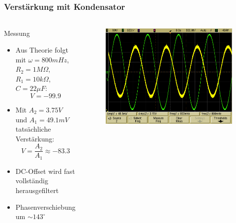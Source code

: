 \begin{frame}
\frametitle{Verstärkung mit Kondensator}
\framesubtitle{}
    \begin{columns}[c]
        \begin{block}{Messung}
        \begin{itemize}
            \item Aus Theorie folgt mit
            $\omega=800mHz$,$R_2=1M\Omega$,$R_1=10k\Omega$,$C=22\mu F$:
            \begin{equation*}
                V = -99.9
            \end{equation*}
            \item Mit $A_2 = 3.75 V$ und $A_1=49.1mV$ tatsächliche Verstärkung:
            \begin{equation*}
                V = \frac{A_2}{A_1} \approx -83.3
            \end{equation*}
            \item DC-Offset wird fast vollständig herausgefiltert
            \item Phasenverschiebung um $\sim 143^{\circ}$
        \end{itemize}
        \end{block}
    \begin{figure}[H]
    \begin{center}
            \includegraphics[scale=0.15]{./img/oszi/scope_2.png}
    \end{center}
    \end{figure}
    \end{columns}
\end{frame}


